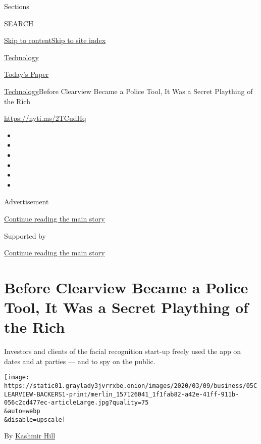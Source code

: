Sections

SEARCH

\protect\hyperlink{site-content}{Skip to
content}\protect\hyperlink{site-index}{Skip to site index}

\href{https://www.nytimes3xbfgragh.onion/section/technology}{Technology}

\href{https://myaccount.nytimes3xbfgragh.onion/auth/login?response_type=cookie\&client_id=vi}{}

\href{https://www.nytimes3xbfgragh.onion/section/todayspaper}{Today's
Paper}

\href{/section/technology}{Technology}\textbar{}Before Clearview Became
a Police Tool, It Was a Secret Plaything of the Rich

\url{https://nyti.ms/2TCudHq}

\begin{itemize}
\item
\item
\item
\item
\item
\item
\end{itemize}

Advertisement

\protect\hyperlink{after-top}{Continue reading the main story}

Supported by

\protect\hyperlink{after-sponsor}{Continue reading the main story}

\hypertarget{before-clearview-became-a-police-tool-it-was-a-secret-plaything-of-the-rich}{%
\section{Before Clearview Became a Police Tool, It Was a Secret
Plaything of the
Rich}\label{before-clearview-became-a-police-tool-it-was-a-secret-plaything-of-the-rich}}

Investors and clients of the facial recognition start-up freely used the
app on dates and at parties --- and to spy on the public.

\texttt{[image: https://static01.graylady3jvrrxbe.onion/images/2020/03/09/business/05CLEARVIEW-BACKERS1-print/merlin\_157126041\_1f1fab82-a42e-41ff-911b-056c2cd477ec-articleLarge.jpg?quality=75\\\&auto=webp\\\&disable=upscale]}

By \href{https://www.nytimes3xbfgragh.onion/by/kashmir-hill}{Kashmir
Hill}

